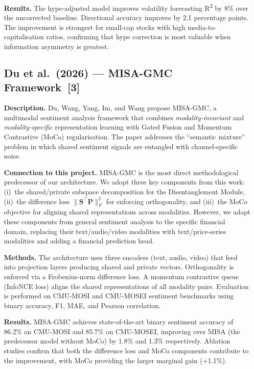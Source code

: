 \documentclass[12pt, a4paper]{article}
\begin{document}
\textbf{Results.}
The hype-adjusted model improves volatility forecasting R\textsuperscript{2} by 8\% over the uncorrected baseline. Directional accuracy improves by 2.1 percentage points. The improvement is strongest for small-cap stocks with high media-to-capitalisation ratios, confirming that hype correction is most valuable when information asymmetry is greatest.


\subsection{Du et al.\ (2026) --- MISA-GMC Framework~[3]}

\textbf{Description.}
Du, Wang, Yang, Im, and Wang propose MISA-GMC, a multimodal sentiment analysis framework that combines \textit{modality-invariant} and \textit{modality-specific} representation learning with Gated Fusion and Momentum Contrastive (MoCo) regularisation. The paper addresses the ``semantic mixture'' problem in which shared sentiment signals are entangled with channel-specific noise.

\textbf{Connection to this project.}
MISA-GMC is the most direct methodological predecessor of our architecture. We adopt three key components from this work: (i)~the shared/private subspace decomposition for the Disentanglement Module, (ii)~the difference loss $\|\mathbf{S}^\top \mathbf{P}\|_F^2$ for enforcing orthogonality, and (iii)~the MoCo objective for aligning shared representations across modalities. However, we adapt these components from general sentiment analysis to the specific financial domain, replacing their text/audio/video modalities with text/price-series modalities and adding a financial prediction head.

\textbf{Methods.}
The architecture uses three encoders (text, audio, video) that feed into projection layers producing shared and private vectors. Orthogonality is enforced via a Frobenius-norm difference loss. A momentum contrastive queue (InfoNCE loss) aligns the shared representations of all modality pairs. Evaluation is performed on CMU-MOSI and CMU-MOSEI sentiment benchmarks using binary accuracy, F1, MAE, and Pearson correlation.

\textbf{Results.}
MISA-GMC achieves state-of-the-art binary sentiment accuracy of 86.2\% on CMU-MOSI and 85.7\% on CMU-MOSEI, improving over MISA (the predecessor model without MoCo) by 1.8\% and 1.3\% respectively. Ablation studies confirm that both the difference loss and MoCo components contribute to the improvement, with MoCo providing the larger marginal gain (+1.1\%).
\end{document}
